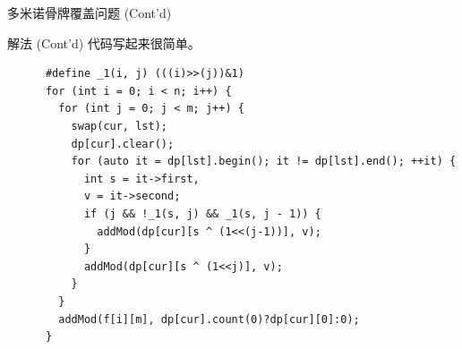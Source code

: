 \documentclass[hyperref={unicode=true}]{beamer}
\theoremstyle{definition}
\theoremstyle{proof}
\begin{document}
\begin{frame}[fragile]{多米诺骨牌覆盖问题 (Cont'd)}
  \begin{exampleblock}{解法 (Cont'd)}
    代码写起来很简单。
    \begin{verbatim}
      #define _1(i, j) (((i)>>(j))&1)
      for (int i = 0; i < n; i++) {
        for (int j = 0; j < m; j++) {
          swap(cur, lst);
          dp[cur].clear();
          for (auto it = dp[lst].begin(); it != dp[lst].end(); ++it) {
            int s = it->first,
            v = it->second;
            if (j && !_1(s, j) && _1(s, j - 1)) {
              addMod(dp[cur][s ^ (1<<(j-1))], v);
            }
            addMod(dp[cur][s ^ (1<<j)], v);
          }
        }
        addMod(f[i][m], dp[cur].count(0)?dp[cur][0]:0);
      }

    \end{verbatim}
  \end{exampleblock}
\end{frame}
\end{document}
